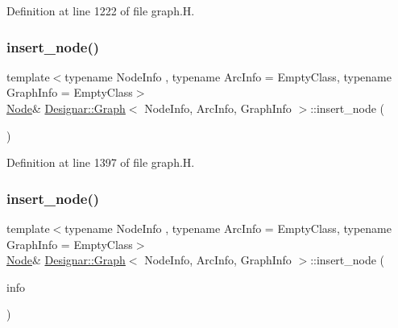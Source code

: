 Definition at line 1222 of file graph.\+H.

\mbox{\label{class_designar_1_1_graph_a5da24cc7de9ae39b1df684cb75782fed}} 
\subsubsection{\texorpdfstring{insert\+\_\+node()}{insert\_node()}\hspace{0.1cm}{\footnotesize\ttfamily [2/4]}}
{\footnotesize\ttfamily template$<$typename Node\+Info , typename Arc\+Info  = Empty\+Class, typename Graph\+Info  = Empty\+Class$>$ \\
\hyperlink{class_designar_1_1_graph_a5dfc7dba9d092ac489c72e40390c37d0}{Node}\& \hyperlink{class_designar_1_1_graph}{Designar\+::\+Graph}$<$ Node\+Info, Arc\+Info, Graph\+Info $>$\+::insert\+\_\+node (\begin{DoxyParamCaption}{ }\end{DoxyParamCaption})\hspace{0.3cm}{\ttfamily [inline]}}



Definition at line 1397 of file graph.\+H.

\mbox{\label{class_designar_1_1_graph_a573d7ab63075e30bc8c5aaa2a80548ec}} 
\subsubsection{\texorpdfstring{insert\+\_\+node()}{insert\_node()}\hspace{0.1cm}{\footnotesize\ttfamily [3/4]}}
{\footnotesize\ttfamily template$<$typename Node\+Info , typename Arc\+Info  = Empty\+Class, typename Graph\+Info  = Empty\+Class$>$ \\
\hyperlink{class_designar_1_1_graph_a5dfc7dba9d092ac489c72e40390c37d0}{Node}\& \hyperlink{class_designar_1_1_graph}{Designar\+::\+Graph}$<$ Node\+Info, Arc\+Info, Graph\+Info $>$\+::insert\+\_\+node (\begin{DoxyParamCaption}\item[{const Node\+Info \&}]{info }\end{DoxyParamCaption})\hspace{0.3cm}{\ttfamily [inline]}}



